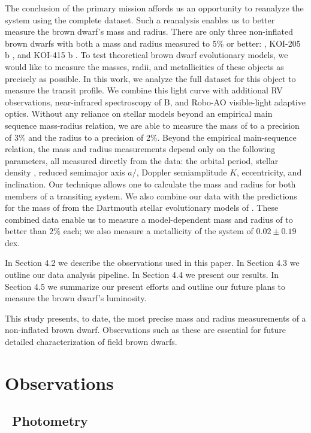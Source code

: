 The conclusion of the primary \itk{} mission affords us an opportunity to reanalyze the \LHS{} system using the complete \itk{} dataset. 
Such a reanalysis enables us to better measure the brown dwarf's mass and radius. 
There are only three non-inflated brown dwarfs with both a mass and radius measured to $5\%$ or better: \LC, KOI-205 b \citep{Diaz13}, and KOI-415 b \citep{Moutou13}.  
To test theoretical brown dwarf evolutionary models, we would like to measure the masses, radii, and metallicities of these objects as precisely as possible. 
In this work, we analyze the full \itk{} dataset for this object to measure the transit profile.
We combine this light curve with additional RV observations, near-infrared spectroscopy of \LA B, and Robo-AO visible-light adaptive optics.
Without any reliance on stellar models beyond an empirical main sequence mass-radius relation, we are able to measure the mass of \LC{} to a precision of 3\% and the radius to a precision of 2\%. 
Beyond the empirical main-sequence relation, the mass and radius measurements depend only on the following parameters, all measured directly from the data: the orbital period, stellar density \rhostar, reduced semimajor axis $a/$\rstar, Doppler semiamplitude $K$, eccentricity, and inclination.
Our technique allows one to calculate the mass and radius for both members of a transiting system.
We also combine our data with the predictions for the mass of \LA{} from the Dartmouth stellar evolutionary models of \citet{Dotter08}.
These combined data enable us to measure a model-dependent mass and radius of \LC{} to better than $2\%$ each; we also measure a metallicity of the system of $0.02 \pm 0.19$ dex. 

In Section 4.2 we describe the observations used in this paper. 
In Section 4.3 we outline our data analysis pipeline. 
In Section 4.4 we present our results.
In Section 4.5 we summarize our present efforts and outline our future plans to measure the brown dwarf's luminosity.


This study presents, to date, the most precise mass and radius measurements of a non-inflated brown dwarf. 
Observations such as these are essential for future detailed characterization of field brown dwarfs.



\section{Observations}
\subsection{\itk\ Photometry}


